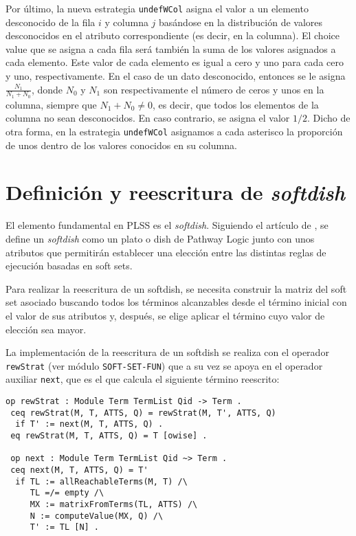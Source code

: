 Por último, la nueva estrategia \texttt{undefWCol} asigna el valor a un elemento desconocido de la fila $i$ y columna $j$ basándose en la distribución de valores desconocidos en el atributo correspondiente (es decir, en la columna).
El choice value que se asigna a cada fila será también la suma de los valores asignados a cada elemento.
Este valor de cada elemento es igual a cero y uno para cada cero y uno, respectivamente.
En el caso de un dato desconocido, entonces se le asigna
$\frac{N_1}{N_1+N_0}$,
donde $N_0$ y $N_1$ son respectivamente el número de ceros y unos en la columna,
siempre que $N_1+N_0\neq0$, es decir, que todos los elementos de la columna no sean desconocidos.
En caso contrario, se asigna el valor $1/2$.
Dicho de otra forma, en la estrategia \texttt{undefWCol} asignamos a cada asterisco la proporción de unos dentro de los valores conocidos en su columna.
\smallskip


\section{Definición y reescritura de \textit{softdish}}
\label{sec:rewStrat}

El elemento fundamental en PLSS es el \textit{softdish}. 
Siguiendo el artículo de \citet{santos2019soft}, se define un \textit{softdish} como un plato o dish de Pathway Logic junto con unos atributos que permitirán establecer una elección entre las distintas reglas de ejecución basadas en soft sets.
\smallskip

Para realizar la reescritura de un softdish, se necesita construir la matriz del soft set asociado buscando todos los términos alcanzables desde el término inicial con el valor de sus atributos y,
después, se elige aplicar el término cuyo valor de elección sea mayor.
\smallskip

La implementación de la reescritura de un softdish se realiza con el operador \texttt{rewStrat} (ver módulo \texttt{SOFT-SET-FUN}) que a su vez se apoya en el operador auxiliar \texttt{next}, que es el que calcula el siguiente término reescrito:

\begin{lstlisting}[language=Maude]
 op rewStrat : Module Term TermList Qid -> Term .
 ceq rewStrat(M, T, ATTS, Q) = rewStrat(M, T', ATTS, Q)
  if T' := next(M, T, ATTS, Q) .
 eq rewStrat(M, T, ATTS, Q) = T [owise] .

 op next : Module Term TermList Qid ~> Term .
 ceq next(M, T, ATTS, Q) = T'
  if TL := allReachableTerms(M, T) /\
     TL =/= empty /\
     MX := matrixFromTerms(TL, ATTS) /\
     N := computeValue(MX, Q) /\
     T' := TL [N] .
\end{lstlisting}

